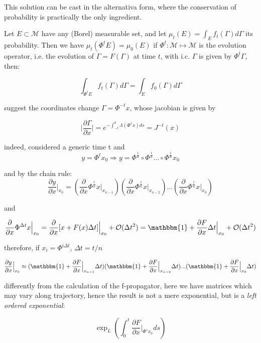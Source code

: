 \documentclass{article}
\begin{document}
This solution can be cast in the alternativa form, where the conservation of probability is practically the only ingredient.

Let $E \subset \mathcal{M} $ have any (Borel) measurable set, and let  $ \mu_t(E) = \int_{E} f_t(\Gamma) d \Gamma$ its probability. Then we have $\mu_t(\Phi^t E) = \mu_0 (E) $ if $\Phi^t : \mathcal{M} \mapsto \mathcal{M} $ is the evolution operator, i.e. the evolution of $\dot{\Gamma} = F(\Gamma)$ at time $t$, with i.c. $\Gamma$ is given by $\Phi^t \Gamma$, then:

$$ \int_{\Phi^t E} f_t(\Gamma) d \Gamma = \int_{E} f_0(\Gamma) d \Gamma $$

suggest the coordinates change $\Gamma = \Phi^{-t} x$, whose jacobian is given by

$$ \big | \frac{\partial \Gamma}{\partial x} \big | = e^{- \int_{-t}^{0} \Lambda({\Phi^s x}) ds} = J^{-t}(x)$$

indeed, considered a generic time t and 
$$y=\Phi^t x_0 \Rightarrow y = \Phi^{ \frac{t}{n}} \circ  \Phi^{ \frac{t}{n}} ... \circ  \Phi^{ \frac{t}{n}} x_0$$

and by the chain rule:
$$ \frac{ \partial y}{\partial x} \Big |_{x_0} =  (\frac{\partial}{\partial x} \Phi^{\frac{t}{n}} x \Big |_{x_{n-1}}) (\frac{\partial}{\partial x} \Phi^{\frac{t}{n}} x\Big |_{x_{n-2}}) ... (\frac{\partial}{\partial x} \Phi^{\frac{t}{n}} x \Big |_{x_{0}}) $$

and

$$ \frac{\partial}{ \partial x} \Phi^{\Delta t} x \Big |_{x_0} = \frac{\partial}{\partial x} [x + F(x) \Delta t]  \Big |_{x_0} + \mathcal{O}(\Delta t^2) = \mathbbm{1} + \frac{\partial F}{\partial x} \Delta t \Big |_{x_0} + \mathcal{O}(\Delta t^2)$$

therefore, if $x_i = \Phi^{i \Delta t}$, $\Delta t = t/n$

$$ \frac{ \partial y}{\partial x} \Big |_{x_0} \approx (\mathbbm{1} + \frac{\partial F}{\partial x}\Big |_{x_{n-1}}  \Delta t  ) (\mathbbm{1} + \frac{\partial F}{\partial x}\Big |_{x_{n-2}}  \Delta t  ) ... (\mathbbm{1} + \frac{\partial F}{\partial x}\Big |_{x_{0}}  \Delta t  )$$

differently from the calculation of the f-propagator, here we have matrices which may vary along trajectory, hence the result is not a mere exponential, but is a \emph{left ordered exponential}:

$$ \exp_L({\int_{0}^{t} \frac{\partial F}{\partial x} \big |_{\Phi^s x_0} ds}) $$
\end{document}

